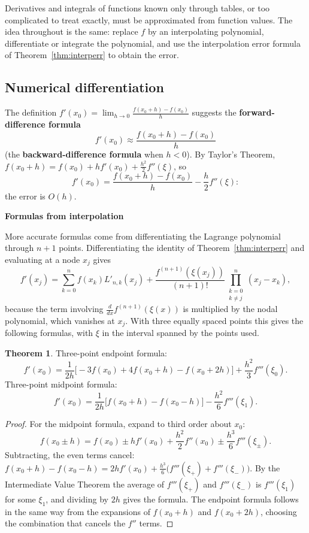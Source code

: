 \documentclass[11pt,a4paper]{article}
\numberwithin{equation}{section}
\theoremstyle{definition}
\newtheorem{thm}{Theorem}[subsection]
\newcommand{\subhead}[1]{%
  \par\medskip\noindent\textbf{#1}\par\nobreak\smallskip}
\begin{document}
Derivatives and integrals of functions known only through tables, or too complicated to treat exactly, must be approximated from
function values. The idea throughout is the same: replace $f$ by an interpolating polynomial, differentiate or integrate the polynomial,
and use the interpolation error formula of Theorem~\ref{thm:interperr} to obtain the error.


\subsection{Numerical differentiation}
\label{sec:numdiff}

The definition $f'(x_0) = \lim_{h\rightarrow0}\frac{f(x_0+h)-f(x_0)}{h}$ suggests the \textbf{forward-difference formula}
$$f'(x_0)\approx\frac{f(x_0+h)-f(x_0)}{h}$$
(the \textbf{backward-difference formula} when $h<0$). By Taylor's Theorem, $f(x_0+h) = f(x_0)+hf'(x_0)+\frac{h^2}2f''(\xi)$, so
$$f'(x_0) = \frac{f(x_0+h)-f(x_0)}{h}-\frac h2f''(\xi):$$
the error is $O(h)$.

\subhead{Formulas from interpolation}
More accurate formulas come from differentiating the Lagrange polynomial through $n+1$ points. Differentiating the identity of
Theorem~\ref{thm:interperr} and evaluating at a node $x_j$ gives
$$f'(x_j) = \sum_{k=0}^nf(x_k)L'_{n,k}(x_j)+\frac{f^{(n+1)}(\xi(x_j))}{(n+1)!}\prod_{\substack{k = 0\\ k\neq j}}^n(x_j-x_k),$$
because the term involving $\frac{d}{dx}f^{(n+1)}(\xi(x))$ is multiplied by the nodal polynomial, which vanishes at $x_j$. With three equally
spaced points this gives the following formulas, with $\xi$ in the interval spanned by the points used.

\begin{thm}
\label{thm:threepoint}
Three-point endpoint formula:
$$f'(x_0) = \frac{1}{2h}\bigl[-3f(x_0)+4f(x_0+h)-f(x_0+2h)\bigr]+\frac{h^2}{3}f'''(\xi_0) .$$
Three-point midpoint formula:
$$f'(x_0) = \frac{1}{2h}\bigl[f(x_0+h)-f(x_0-h)\bigr]-\frac{h^2}{6}f'''(\xi_1) .$$
\end{thm}

\begin{proof}
For the midpoint formula, expand to third order about $x_0$:
$$f(x_0\pm h) = f(x_0)\pm hf'(x_0)+\frac{h^2}2f''(x_0)\pm\frac{h^3}{6}f'''(\xi_\pm) .$$
Subtracting, the even terms cancel: $f(x_0+h)-f(x_0-h) = 2hf'(x_0)+\frac{h^3}{6}\bigl(f'''(\xi_+)+f'''(\xi_-)\bigr)$. By the Intermediate Value
Theorem the average of $f'''(\xi_+)$ and $f'''(\xi_-)$ is $f'''(\xi_1)$ for some $\xi_1$, and dividing by $2h$ gives the formula. The endpoint
formula follows in the same way from the expansions of $f(x_0+h)$ and $f(x_0+2h)$, choosing the combination that cancels the $f''$ terms.
\end{proof}
\end{document}
